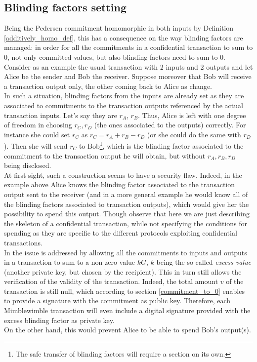 \subsection{Blinding factors setting}
\label{sec::blinding_factors_setting}
Being the Pedersen commitment homomorphic in both inputs by Definition \ref{additively_homo_def}, this has a consequence on the way blinding factors are managed: in order for all the commitments in a confidential transaction to sum to 0, not only committed values, but also blinding factors need to sum to 0.\\
Consider as an example the usual transaction with 2 inputs and 2 outputs and let Alice be the sender and Bob the receiver. Suppose moreover that Bob will receive a transaction output only, the other coming back to Alice as change.\\
In such a situation, blinding factors from the inputs are already set as they are associated to commitments to the transaction outputs referenced by the actual transaction inputs. Let's say they are $r_A$, $r_B$. Thus, Alice is left with one degree of freedom in choosing $r_C, r_D$ (the ones associated to the outputs) correctly. For instance she could set $r_C$ as $r_C = r_A + r_B - r_D$ (or she could do the same with $r_D$). Then she will send $r_C$ to Bob\footnote{The safe transfer of blinding factors will require a section on its own.}, which is the blinding factor associated to the commitment to the transaction output he will obtain, but without $r_A, r_B, r_D$ being disclosed.\\
At first sight, such a construction seems to have a security flaw. Indeed, in the example above Alice knows the blinding factor associated to the transaction output sent to the receiver (and in a more general example he would know all of the blinding factors associated to transaction outputs), which would give her the possibility to spend this output. Though observe that here we are just describing the skeleton of a confidential transaction, while not specifying the conditions for spending as they are specific to the different protocols exploiting confidential transactions.\\
In \cite{MW, PoeMW} the issue is addressed by allowing all the commitments to inputs and outputs in a transaction to sum to a non-zero value $kG$, $k$ being the so-called \textit{excess value} (another private key, but chosen by the recipient). This in turn still allows the verification of the validity of the transaction. Indeed, the total amount $v$ of the transaction is still null, which according to section \ref{commitment_to_0} enables to provide a signature with the commitment as public key. Therefore, each Mimblewimble transaction will even include a digital signature provided with the excess blinding factor as private key.\\
On the other hand, this would prevent Alice to be able to spend Bob's output(s).

